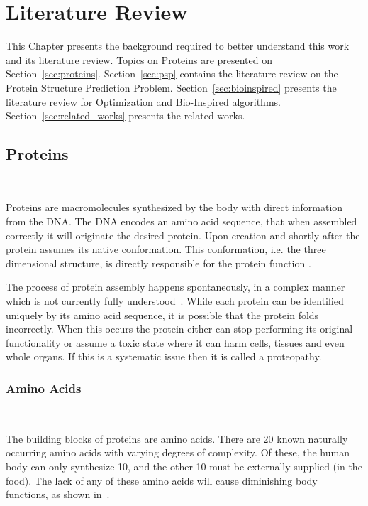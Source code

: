\chapter{Literature Review}\label{chap:systematic_literature_review}

This Chapter presents the background required to better understand
this work and its literature review. Topics on Proteins are presented on
Section~\ref{sec:proteins}. Section~\ref{sec:psp} contains the literature
review on the Protein Structure Prediction Problem. Section~\ref{sec:bioinspired}
presents the literature review for Optimization and Bio-Inspired algorithms.
Section~\ref{sec:related_works} presents the related works.

\section{Proteins}~\label{sec:proteins}

Proteins are macromolecules synthesized by the body with direct information from
the \ac{DNA}. The \ac{DNA} encodes an amino acid sequence, that when assembled correctly it
will originate the desired protein. Upon creation and shortly after the protein
assumes its native conformation. This conformation, i.e. the three dimensional
structure, is directly responsible for the protein function
\cite{lee2017ab}.

The process of protein assembly happens spontaneously, in a complex manner which
is not currently fully understood~\cite{dill2008protein}.
While each protein can be identified uniquely by
its amino acid sequence, it is possible that the protein folds incorrectly.
When this occurs the protein either can stop performing its
original functionality or assume a toxic state where it can harm cells,
tissues and even whole organs.
If this is a systematic issue then it is called a proteopathy.

\subsection{Amino Acids}~\label{sec:amino-acids}

The building blocks of proteins are amino acids. There are 20 known naturally
occurring amino acids with varying degrees of complexity. Of these, the human
body can only synthesize 10, and the other 10 must be externally supplied
(in the food). The lack of any of these amino acids will cause diminishing
body functions, as shown in~\cite{crews1969weight}.

